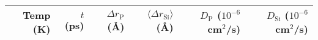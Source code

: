 \documentclass[11pt,bibliography=totoc,index=totoc]{scrbook}   %
\begin{document}
\begin{table}[htbp]
  \centering
  \begin{tabular}{rrrrrr}
    \toprule
Temp (K) & $t$ (ps) & $\Delta r_{\text{P}}$ (Å) & $\langle\Delta r_{\text{Si}}\rangle$ (Å) & $D_{\text{P}}$ ($10^{-6}$~cm$^2$/s) & $D_{\text{Si}}$ ($10^{-6}$~cm$^2$/s) \\
    \midrule

\end{tabular}
\end{table}
\end{document}
